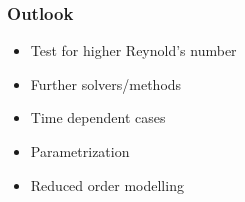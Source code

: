 \documentclass{beamer}
\begin{document}

\begin{frame}
\frametitle{Outlook}
\begin{itemize}

\item Test for higher Reynold's number
\item Further solvers/methods
\item Time dependent cases
\item Parametrization
\item Reduced order modelling

\end{itemize}


\end{frame}





\end{document}

